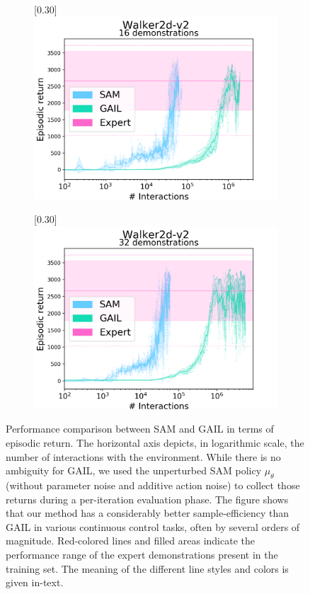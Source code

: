 \begin{figure}
\begin{subfigure}[t]{0.49\textwidth}
    \center\scalebox{0.30}[0.30]{\includegraphics{Plots/sam_gail_Walker2d_s0-1-2-3_d16_results_log}}
  \end{subfigure}
  \begin{subfigure}[t]{0.49\textwidth}
    \center\scalebox{0.30}[0.30]{\includegraphics{Plots/sam_gail_Walker2d_s0-1-2-3_d32_results_log}}
  \end{subfigure}
  \caption{
    Performance comparison between SAM and GAIL in terms of episodic return.
    The horizontal axis depicts, in logarithmic scale, the number of interactions
    with the environment.
    While there is no ambiguity for GAIL, we used the unperturbed SAM
    policy $\mu_\theta$
    (without parameter noise and additive action noise) to collect those returns
    during a per-iteration evaluation phase.
    The figure shows that our method has a considerably better
    sample-efficiency than GAIL in various continuous control tasks,
    often by several orders of magnitude.
    Red-colored lines and filled areas indicate the performance range of the expert
    demonstrations present in the training set.
    The meaning of the different line styles and colors is given in-text.
  }
  \label{fig:resplots}
\end{figure}

